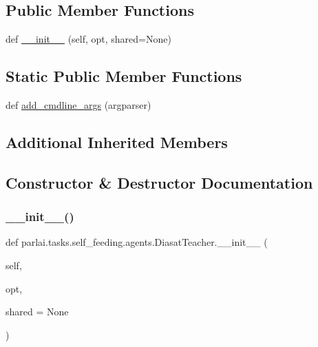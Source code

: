 \subsection*{Public Member Functions}
\begin{DoxyCompactItemize}
\item 
def \hyperlink{classparlai_1_1tasks_1_1self__feeding_1_1agents_1_1DiasatTeacher_aeffe6f4b3c3bd2800c6745da4ab95015}{\+\_\+\+\_\+init\+\_\+\+\_\+} (self, opt, shared=None)
\end{DoxyCompactItemize}
\subsection*{Static Public Member Functions}
\begin{DoxyCompactItemize}
\item 
def \hyperlink{classparlai_1_1tasks_1_1self__feeding_1_1agents_1_1DiasatTeacher_a28eadfed974fe247525076406032e7ec}{add\+\_\+cmdline\+\_\+args} (argparser)
\end{DoxyCompactItemize}
\subsection*{Additional Inherited Members}


\subsection{Constructor \& Destructor Documentation}
\mbox{\label{classparlai_1_1tasks_1_1self__feeding_1_1agents_1_1DiasatTeacher_aeffe6f4b3c3bd2800c6745da4ab95015}} 
\subsubsection{\texorpdfstring{\+\_\+\+\_\+init\+\_\+\+\_\+()}{\_\_init\_\_()}}
{\footnotesize\ttfamily def parlai.\+tasks.\+self\+\_\+feeding.\+agents.\+Diasat\+Teacher.\+\_\+\+\_\+init\+\_\+\+\_\+ (\begin{DoxyParamCaption}\item[{}]{self,  }\item[{}]{opt,  }\item[{}]{shared = {\ttfamily None} }\end{DoxyParamCaption})}



